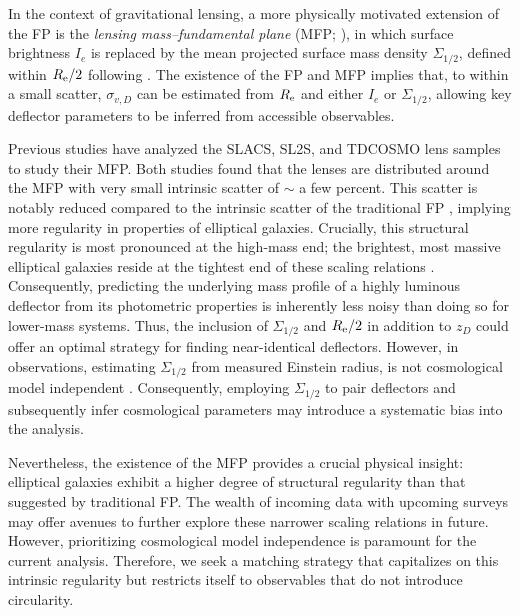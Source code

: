 \documentclass[a4paper,11pt]{article}
\begin{document}
In the context of gravitational lensing, a more physically motivated extension of the FP is the \emph{lensing mass–fundamental plane} (MFP; \cite{Bolton:2007, Auger:2010, Mozumdar:2025}), in which surface brightness $I_{e}$ is replaced by the mean projected surface mass density $\Sigma_{1/2}$, defined within $R_{\rm e}/2$ following \cite{Auger:2010, Mozumdar:2025}. The existence of the FP and MFP implies that, to within a small scatter, $\sigma_{v,D}$ can be estimated from $R_{\rm e}$ and either $I_{e}$ or $\Sigma_{1/2}$, allowing key deflector parameters to be inferred from accessible observables.

Previous studies \citep{Auger:2010, Mozumdar:2025} have analyzed the SLACS, SL2S, and TDCOSMO lens samples to study their MFP. Both studies \citep{Auger:2010, Mozumdar:2025} found that the lenses are distributed around the MFP with very small intrinsic scatter of $\sim$ a few percent.
This scatter is notably reduced compared to the intrinsic scatter of the traditional FP \citep{Gargiulo:2009}, implying more regularity in properties of elliptical galaxies. Crucially, this structural regularity is most pronounced at the high-mass end; the brightest, most massive elliptical galaxies reside at the tightest end of these scaling relations \cite{Desroches:2007}. Consequently, predicting the underlying mass profile of a highly luminous deflector from its photometric properties is inherently less noisy than doing so for lower-mass systems. Thus, the inclusion of $\Sigma_{1/2}$ and $R_{\rm e}/2$ in addition to $z_D$ could offer an optimal strategy for finding near-identical deflectors. However, in observations, estimating $\Sigma_{1/2}$ from measured Einstein radius, is not cosmological model independent \citep[see Equation 14 and 15 in][]{Mozumdar:2025}. Consequently, employing $\Sigma_{1/2}$ to pair deflectors and subsequently infer cosmological parameters may introduce a systematic bias into the analysis.

Nevertheless, the existence of the MFP provides a crucial physical insight: elliptical galaxies exhibit a higher degree of structural regularity than that suggested by traditional FP. The wealth of incoming data with upcoming surveys may offer avenues to further explore these narrower scaling relations in future. However, prioritizing cosmological model independence is paramount for the current analysis. Therefore, we seek a matching strategy that capitalizes on this intrinsic regularity but restricts itself to observables that do not introduce circularity.
\end{document}

